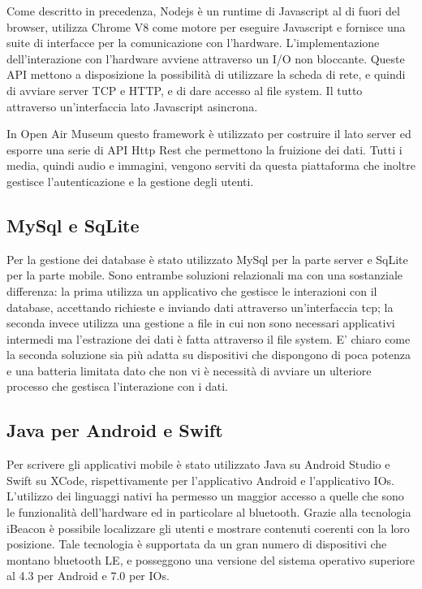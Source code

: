	Come descritto in precedenza, Nodejs è un runtime di Javascript al di fuori del browser, utilizza Chrome V8\cite{V8} come motore per eseguire Javascript e fornisce una suite di interfacce per la comunicazione con l'hardware. L'implementazione dell'interazione con l'hardware avviene attraverso un I/O non bloccante\cite{AsincIO}. Queste API mettono a disposizione la possibilità di utilizzare la scheda di rete, e quindi di avviare server TCP e HTTP, e di dare accesso al file system. Il tutto attraverso un'interfaccia lato Javascript asincrona. \vspace{5mm}
	
	In Open Air Museum questo framework è utilizzato per costruire il lato server ed esporre una serie di API Http Rest che permettono la fruizione dei dati. Tutti i media, quindi audio e immagini, vengono serviti da questa piattaforma che inoltre gestisce l’autenticazione e la gestione degli utenti.\vspace{5mm}
	
	\subsection{MySql e SqLite}\vspace{5mm}
	
	Per la gestione dei database è stato utilizzato MySql per la parte server e SqLite per la parte mobile. Sono entrambe soluzioni relazionali ma con una sostanziale differenza: la prima utilizza un applicativo che gestisce le interazioni con il database, accettando richieste e inviando dati attraverso un'interfaccia tcp; la seconda invece utilizza una gestione a file in cui non sono necessari applicativi intermedi ma l'estrazione dei dati è fatta attraverso il file system. E' chiaro come la seconda soluzione sia più adatta su dispositivi che dispongono di poca potenza e una batteria limitata dato che non vi è necessità di avviare un ulteriore processo che gestisca l'interazione con i dati.\vspace{5mm}
	
	\subsection{Java per Android e Swift}\vspace{5mm}
	
	Per scrivere gli applicativi mobile è stato utilizzato Java su Android Studio e Swift su XCode, rispettivamente per l'applicativo Android e l'applicativo IOs. L'utilizzo dei linguaggi nativi ha permesso un maggior accesso a quelle che sono le funzionalità dell'hardware ed in particolare al bluetooth. Grazie alla tecnologia iBeacon è possibile localizzare gli utenti e mostrare contenuti coerenti con la loro posizione. Tale tecnologia è supportata da un gran numero di dispositivi che montano bluetooth LE, e posseggono una versione del sistema operativo superiore al 4.3 per Android e 7.0 per IOs.
	
